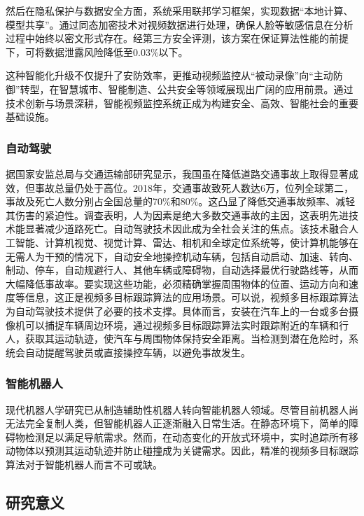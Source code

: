 然后在隐私保护与数据安全方面，系统采用联邦学习框架，实现数据“本地计算、模型共享”。通过同态加密技术对视频数据进行处理，确保人脸等敏感信息在分析过程中始终以密文形式存在。经第三方安全评测，该方案在保证算法性能的前提下，可将数据泄露风险降低至0.03\%以下。

这种智能化升级不仅提升了安防效率，更推动视频监控从“被动录像”向“主动防御”转型，在智慧城市、智能制造、公共安全等领域展现出广阔的应用前景。通过技术创新与场景深耕，智能视频监控系统正成为构建安全、高效、智能社会的重要基础设施。


\subsubsection{自动驾驶}

据国家安监总局与交通运输部研究显示，我国虽在降低道路交通事故上取得显著成效，但事故总量仍处于高位。2018年，交通事故致死人数达6万，位列全球第二，事故及死亡人数分别占全国总量的70\%和80\%。这凸显了降低交通事故频率、减轻其伤害的紧迫性。调查表明，人为因素是绝大多数交通事故的主因，这表明先进技术能显著减少道路死亡。自动驾驶技术因此成为全社会关注的焦点。该技术融合人工智能、计算机视觉、视觉计算、雷达、相机和全球定位系统等，使计算机能够在无需人为干预的情况下，自动安全地操控机动车辆，包括自动启动、加速、转向、制动、停车，自动规避行人、其他车辆或障碍物，自动选择最优行驶路线等，从而大幅降低事故率。要实现这些功能，必须精确掌握周围物体的位置、运动方向和速度等信息，这正是视频多目标跟踪算法的应用场景。可以说，视频多目标跟踪算法为自动驾驶技术提供了必要的技术支撑。具体而言，安装在汽车上的一台或多台摄像机可以捕捉车辆周边环境，通过视频多目标跟踪算法实时跟踪附近的车辆和行人，获取其运动轨迹，使汽车与周围物体保持安全距离。当检测到潜在危险时，系统会自动提醒驾驶员或直接操控车辆，以避免事故发生。

\subsubsection{智能机器人}

现代机器人学研究已从制造辅助性机器人转向智能机器人领域。尽管目前机器人尚无法完全复制人类，但智能机器人正逐渐融入日常生活。在静态环境下，简单的障碍物检测足以满足导航需求。然而，在动态变化的开放式环境中，实时追踪所有移动物体以预测其运动轨迹并防止碰撞成为关键需求。因此，精准的视频多目标跟踪算法对于智能机器人而言不可或缺。

\subsection{研究意义}

